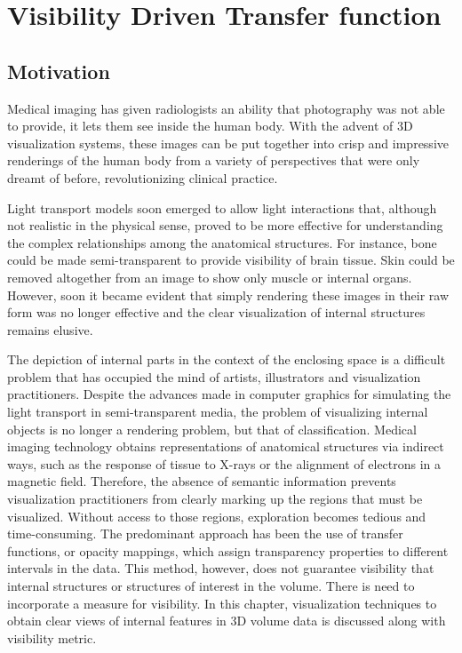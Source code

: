 

\chapter{Visibility Driven Transfer function}\label{chap:ch4_abbr}

\section{Motivation}

Medical imaging has given radiologists an ability that photography was not able to provide, it lets them see inside the human body. With the advent of 3D visualization systems, these images can be put together into crisp and impressive renderings of the human body from a variety of perspectives that were only dreamt of before, revolutionizing clinical practice.

Light transport models soon emerged to allow light interactions that, although not realistic in the physical sense, proved to be more effective for understanding the complex relationships among the anatomical structures. For instance, bone could be made semi-transparent to provide visibility of brain tissue. Skin could be removed altogether from an image to show only muscle or internal organs. However, soon it
became evident that simply rendering these images in their raw form was no longer effective and the clear visualization of internal structures remains elusive.

The depiction of internal parts in the context of the enclosing space is a difficult problem that has occupied the mind of artists, illustrators and visualization practitioners. Despite the advances made in computer graphics for simulating the light transport in semi-transparent media, the problem of visualizing internal objects is no longer a rendering problem, but that of classification. Medical imaging technology obtains representations of anatomical structures via indirect ways, such as the response of tissue to X-rays or the alignment of electrons in a magnetic field. Therefore, the absence of semantic information prevents visualization practitioners from clearly marking up the regions that must be visualized. Without access to those regions, exploration becomes tedious and time-consuming. The predominant approach has been the use of transfer functions, or opacity mappings, which assign transparency properties to different intervals in the data. This method, however, does not guarantee visibility that internal structures or structures of interest in the volume. There is need to incorporate a measure for visibility. In this chapter, visualization techniques to obtain clear views of internal features in 3D volume data is discussed along with visibility metric.

